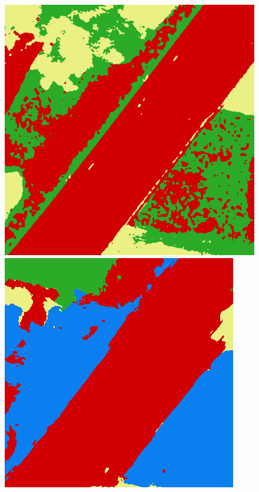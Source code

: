 \begin{figure}
    \includegraphics[width=\UnetPredictionsImageWidth]{images/unet/unet-18D/104483-prediction} \hfill
    \includegraphics[width=\UnetPredictionsImageWidth]{images/unet/unet-23/104483-prediction} \hfill

\end{figure}
